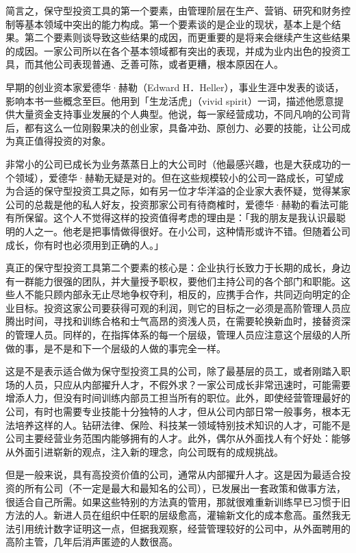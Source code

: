 \documentclass[UTF8,a4paper,zihao=-4,fontset = windows]{ctexart} %
\begin{document}
简言之，保守型投资工具的第一个要素，由管理阶层在生产、营销、研究和财务控制等基本领域中突出的能力构成。第一个要素谈的是企业的现状，基本上是个结果。第二个要素则谈导致这些结果的成因，而更重要的是将来会继续产生这些结果的成因。一家公司所以在各个基本领域都有突出的表现，并成为业内出色的投资工具，而其他公司表现普通、乏善可陈，或者更糟，根本原因在人。

早期的创业资本家爱德华·赫勒（Edward H．Heller），事业生涯中发表的谈话，影响本书一些概念至巨。他用到「生龙活虎」（vivid spirit）一词，描述他愿意提供大量资金支持事业发展的个人典型。他说，每一家经营成功，不同凡响的公司背后，都有这么一位刚毅果决的创业家，具备冲劲、原创力、必要的技能，让公司成为真正值得投资的对象。

非常小的公司已成长为业务蒸蒸日上的大公司时（他最感兴趣，也是大获成功的一个领域），爱德华·赫勒无疑是对的。但在这些规模较小的公司一路成长，可望成为合适的保守型投资工具之际，如有另一位才华洋溢的企业家大表怀疑，觉得某家公司的总裁是他的私人好友，投资那家公司有待商榷时，爱德华·赫勒的看法可能有所保留。这个人不觉得这样的投资值得考虑的理由是：「我的朋友是我认识最聪明的人之一。他老是把事情做得很好。在小公司，这种情形或许不错。但随着公司成长，你有时也必须用到正确的人。」

真正的保守型投资工具第二个要素的核心是：企业执行长致力于长期的成长，身边有一群能力很强的团队，并大量授予职权，要他们主持公司的各个部门和职能。这些人不能只顾内部永无止尽地争权夺利，相反的，应携手合作，共同迈向明定的企业目标。投资这家公司要获得可观的利润，则它的目标之一必须是高阶管理人员应腾出时间，寻找和训练合格和士气高昂的资浅人员，在需要轮换新血时，接替资深的管理人员。同样的，在指挥体系的每一个层级，管理人员应注意这个层级的人所做的事，是不是和下一个层级的人做的事完全一样。

这是不是表示适合做为保守型投资工具的公司，除了最基层的员工，或者刚踏入职场的人员，只应从内部擢升人才，不假外求？一家公司成长非常迅速时，可能需要增添人力，但没有时间训练内部员工担当所有的职位。此外，即使经营管理最好的公司，有时也需要专业技能十分独特的人才，但从公司内部日常一般事务，根本无法培养这样的人。钻研法律、保险、科技某一领域特别技术知识的人才，可能不是公司主要经营业务范围内能够拥有的人才。此外，偶尔从外面找人有个好处：能够从外面引进崭新的观点，注入新的理念，向公司既有的成规挑战。

但是一般来说，具有高投资价值的公司，通常从内部擢升人才。这是因为最适合投资的所有公司（不一定是最大和最知名的公司），已发展出一套政策和做事方法，很适合自己所需。如果这些特别的方法真的管用，那就很难重新训练早已习惯于旧方法的人。新进人员在组织中任职的层级愈高，灌输新文化的成本愈高。虽然我无法引用统计数字证明这一点，但据我观察，经营管理较好的公司中，从外面聘用的高阶主管，几年后消声匿迹的人数很高。
\end{document}
